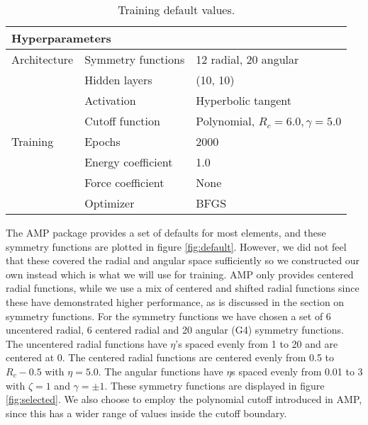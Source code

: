 \begin{table}[H]
\centering
\begin{tabular}{@{}lll@{}}
\toprule
\multicolumn{3}{l}{Hyperparameters}                                    \\ \midrule
Architecture & Symmetry functions & 12 radial, 20 angular               \\
             & Hidden layers      & (10, 10)                           \\
             & Activation         & Hyperbolic tangent                 \\
             & Cutoff function    & Polynomial, $R_c = 6.0, \gamma = 5.0$
             \\
Training     & Epochs             & 2000                               \\
             & Energy coefficient & 1.0                                \\
             & Force coefficient  & None                                \\
             & Optimizer          & BFGS                               \\ \bottomrule
\end{tabular}
\caption{Training default values.}
\label{table:defaults}
\end{table}

The AMP package provides a set of defaults for most elements,
and these symmetry functions are plotted in figure \ref{fig:default}.
However, we did not feel that these covered the radial and angular space
sufficiently so we constructed our own instead which is what we will
use for training. AMP only provides centered radial functions,
while we use a mix of centered and shifted radial functions
since these have demonstrated higher performance, as is discussed
in the section on symmetry functions.
For the symmetry functions we have chosen a set of 6 uncentered radial,
6 centered radial and 20 angular (G4)
symmetry functions.
The uncentered radial functions have $\eta$'s spaced evenly
from 1 to 20 and are centered at 0. The centered radial functions
are centered evenly from 0.5 to $R_c - 0.5$ with $\eta = 5.0$.
The angular functions have $\eta$s spaced evenly from
0.01 to 3 with $\zeta = 1$ and $\gamma = \pm 1$.
These symmetry functions are displayed in figure \ref{fig:selected}.
We also choose to employ the polynomial cutoff introduced in AMP,
since this has a wider range of values inside the cutoff boundary.

